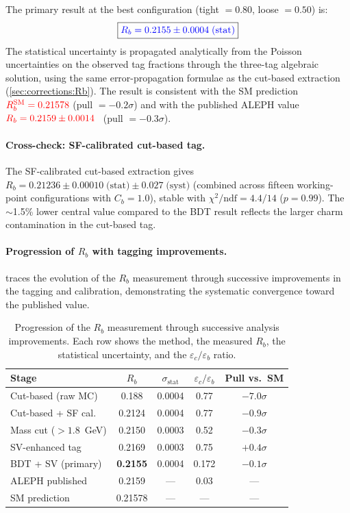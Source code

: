 \documentclass[11pt,a4paper]{article}
\newcommand{\measured}[1]{\textcolor{blue}{#1}}
\newcommand{\external}[1]{\textcolor{red}{#1}}
\begin{document}
The primary result at the best configuration
(tight $= 0.80$, loose $= 0.50$) is:
\begin{equation}
\boxed{
\measured{R_b = 0.2155 \pm 0.0004\;\text{(stat)}}
}
\label{eq:rb_bdt_fulldata}
\end{equation}
The statistical uncertainty is propagated analytically from the
Poisson uncertainties on the observed tag fractions through the
three-tag algebraic solution, using the same error-propagation
formulae as the cut-based extraction
(\cref{sec:corrections:Rb}).
The result is consistent with the SM prediction
$\external{R_b^\text{SM} = 0.21578}$ (pull $= -0.2\sigma$) and
with the published ALEPH value
$\external{R_b = 0.2159 \pm 0.0014}$~\cite{ALEPH:Rb:precise}
(pull $= -0.3\sigma$).

\paragraph{Cross-check: SF-calibrated cut-based tag.}

The SF-calibrated cut-based extraction gives
$R_b = 0.21236 \pm 0.00010\;\text{(stat)} \pm 0.027\;\text{(syst)}$
(combined across fifteen working-point configurations with
$C_b = 1.0$), stable with $\chi^2/\text{ndf} = 4.4/14$
($p = 0.99$).
The $\sim$1.5\% lower central value compared to the BDT result
reflects the larger charm contamination in the cut-based tag.

\paragraph{Progression of $R_b$ with tagging improvements.}

 traces the evolution of the $R_b$
measurement through successive improvements in the tagging and
calibration, demonstrating the systematic convergence toward the
published value.

\begin{table}[htbp]
\centering
\caption{Progression of the $R_b$ measurement through successive
analysis improvements.
Each row shows the method, the measured $R_b$, the statistical
uncertainty, and the $\varepsilon_c/\varepsilon_b$ ratio.}
\label{tbl:rb_progression}
\begin{tabular}{lcccc}
\toprule
Stage & $R_b$ & $\sigma_\text{stat}$ &
  $\varepsilon_c/\varepsilon_b$ & Pull vs.\ SM \\
\midrule
Cut-based (raw MC) & 0.188 & 0.0004 & 0.77 & $-7.0\sigma$ \\
Cut-based + SF cal.\ & 0.2124 & 0.0004 & 0.77 & $-0.9\sigma$ \\
Mass cut ($> 1.8$~GeV) & 0.2150 & 0.0003 & 0.52 & $-0.3\sigma$ \\
SV-enhanced tag & 0.2169 & 0.0003 & 0.75 & $+0.4\sigma$ \\
BDT + SV (primary) & \textbf{0.2155} & 0.0004 & 0.172 &
  $-0.1\sigma$ \\
\midrule
ALEPH published & 0.2159 & --- & 0.03 & --- \\
SM prediction & 0.21578 & --- & --- & --- \\
\bottomrule
\end{tabular}
\end{table}
\end{document}
